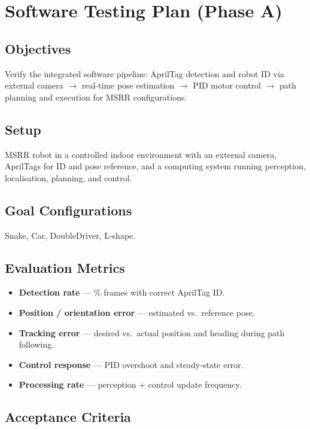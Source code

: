 \documentclass[12pt,a4paper]{article}
\begin{document}
\clearpage
\section{Software Testing Plan (Phase A)}
\label{sec:software-testing}

\subsection{Objectives}

Verify the integrated software pipeline: AprilTag detection and robot ID via external camera $\rightarrow$ real-time pose estimation $\rightarrow$ PID motor control $\rightarrow$ path planning and execution for MSRR configurations.

\subsection{Setup}

MSRR robot in a controlled indoor environment with an external camera, AprilTags for ID and pose reference, and a computing system running perception, localisation, planning, and control.

\subsection{Goal Configurations}

Snake, Car, DoubleDriver, L-shape.

\subsection{Evaluation Metrics}

\begin{itemize}
\item \textbf{Detection rate} --- \% frames with correct AprilTag ID.
\item \textbf{Position / orientation error} --- estimated vs.\ reference pose.
\item \textbf{Tracking error} --- desired vs.\ actual position and heading during path following.
\item \textbf{Control response} --- PID overshoot and steady-state error.
\item \textbf{Processing rate} --- perception + control update frequency.
\end{itemize}

\subsection{Acceptance Criteria}
\end{document}
